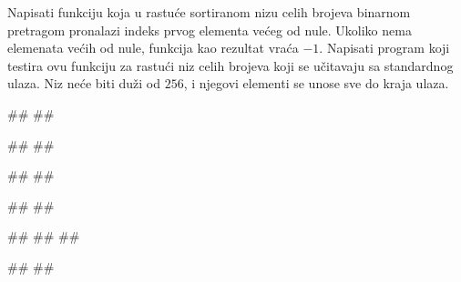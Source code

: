\begin{Answer}[ref=3_07]
\end{Answer}

\begin{Exercise}[label=3_08]
Napisati funkciju koja u rastuće sortiranom nizu celih brojeva
binarnom pretragom pronalazi indeks prvog elementa većeg od
nule. Ukoliko nema elemenata većih od nule, funkcija kao rezultat
vraća $-1$. Napisati program koji testira ovu funkciju za rastući
niz celih brojeva koji se učitavaju sa standardnog ulaza. Niz neće biti
duži od $256$, i njegovi elementi se unose sve do kraja ulaza.

\begin{minitest}
\begin{test}{1}
#\naslovUlaz#
##

#\naslovIzlaz#
##
\end{test}
\end{minitest}
\begin{minitest}
\begin{test}{2}
#\naslovUlaz#
##

#\naslovIzlaz#
##
\end{test}
\end{minitest}
\begin{minitest}
\begin{test}{3}
#\naslovUlaz#
##
##
  
#\naslovIzlaz#
##
\end{test}
\end{minitest}


\end{Exercise}
\begin{Answer}[ref=3_08]
\end{Answer}
